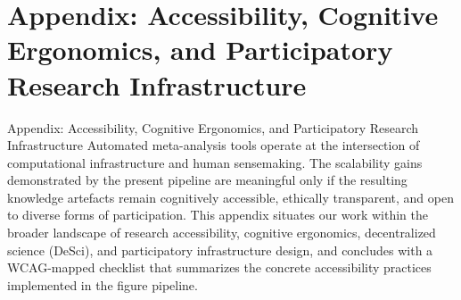 \documentclass[
  ignorenonframetext,
]{beamer}
\author{\texorpdfstring{}{}}
\date{}
\begin{document}
\section{\texorpdfstring{Appendix: Accessibility, Cognitive Ergonomics,
and Participatory Research Infrastructure
\label{sec:accessibility}}{Appendix: Accessibility, Cognitive Ergonomics, and Participatory Research Infrastructure }}\label{appendix-accessibility-cognitive-ergonomics-and-participatory-research-infrastructure}

\begin{frame}[allowframebreaks]{Appendix: Accessibility, Cognitive
Ergonomics, and Participatory Research Infrastructure
\label{sec:accessibility}}
Automated meta-analysis tools operate at the intersection of
computational infrastructure and human sensemaking. The scalability
gains demonstrated by the present pipeline are meaningful only if the
resulting knowledge artefacts remain cognitively accessible, ethically
transparent, and open to diverse forms of participation. This appendix
situates our work within the broader landscape of research
accessibility, cognitive ergonomics, decentralized science (DeSci), and
participatory infrastructure design, and concludes with a WCAG-mapped
checklist that summarizes the concrete accessibility practices
implemented in the figure pipeline.
\end{frame}
\end{document}
